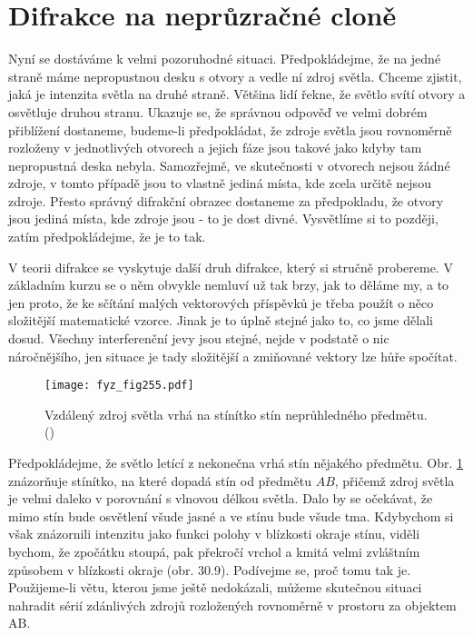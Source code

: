 {  \section{Difrakce na neprůzračné cloně}\label{fyz:IchapXXXsecVI}
    Nyní se dostáváme k velmi pozoruhodné situaci. Předpokládejme, že na jedné straně máme 
    nepropustnou desku s otvory a vedle ní zdroj světla. Chceme zjistit, jaká je intenzita světla 
    na druhé straně. Většina lidí řekne, že světlo svítí otvory a osvětluje druhou stranu. Ukazuje 
    se, že správnou odpověď ve velmi dobrém přiblížení dostaneme, budeme-li předpokládat, že zdroje 
    světla jsou rovnoměrně rozloženy v jednotlivých otvorech a jejich fáze jsou takové jako kdyby 
    tam nepropustná deska nebyla. Samozřejmě, ve skutečnosti v otvorech nejsou žádné zdroje, v 
    tomto případě jsou to vlastně jediná místa, kde zcela určitě nejsou zdroje. Přesto správný 
    difrakční obrazec dostaneme za předpokladu, že otvory jsou jediná místa, kde zdroje jsou - to 
    je dost divné. Vysvětlíme si to později, zatím předpokládejme, že je to tak.
    
    V teorii difrakce se vyskytuje další druh difrakce, který si stručně probereme. V základním 
    kurzu se o něm obvykle nemluví už tak brzy, jak to děláme my, a to jen proto, že ke sčítání 
    malých vektorových příspěvků je třeba použít o něco složitější matematické vzorce. Jinak je to 
    úplně stejné jako to, co jsme dělali dosud. Všechny interferenční jevy jsou stejné, nejde v 
    podstatě o nic náročnějšího, jen situace je tady složitější a zmiňované vektory lze hůře 
    spočítat.

    \begin{figure}[ht!] %
      \centering
      \texttt{[image: fyz\_fig255.pdf]}
      \caption{Vzdálený zdroj světla vrhá na stínítko stín neprůhledného předmětu.
               (\cite[s.~402]{Feynman01})}
      \label{fyz:fig255}
    \end{figure}
    
    Předpokládejme, že světlo letící z nekonečna vrhá stín nějakého předmětu. Obr. \ref{fyz:fig255} 
    znázorňuje stínítko, na které dopadá stín od předmětu \(AB\), přičemž zdroj světla je velmi 
    daleko v porovnání s vlnovou délkou světla. Dalo by se očekávat, že mimo stín bude osvětlení 
    všude jasné a ve stínu bude všude tma. Kdybychom si však znázornili intenzitu jako funkci 
    polohy v blízkosti okraje stínu, viděli bychom, že zpočátku stoupá, pak překročí vrchol a kmitá 
    velmi zvláštním způsobem v blízkosti okraje (obr. 30.9). Podívejme se, proč tomu tak je. 
    Použijeme-li větu, kterou jsme ještě nedokázali, můžeme skutečnou situaci nahradit sérií 
    zdánlivých zdrojů rozložených rovnoměrně v prostoru za objektem AB.


}

